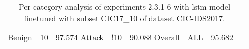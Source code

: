 \begin{table}[htb]
\begin{tabular}{@{}cccccccc@{}}
         \\
        Benign &  10 &  97.574%
        Attack &  !10 &  90.088%
        Overall &  ALL &  95.682%
        \bottomrule
    \end{tabular}
    \caption{Per category analysis of experiments 2.3.1-6 with \gls{lstm} model finetuned with subset CIC17\_10 of dataset CIC-IDS2017.}
    \label{table:results:lstm:class_flows_subset}
\end{table}